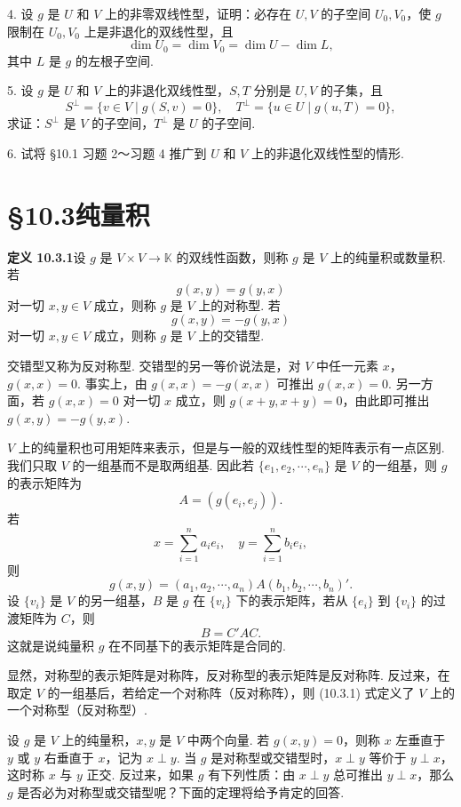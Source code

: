 \documentclass[UTF8, 12pt, fontset=fandol, oneside]{ctexart}
\begin{document}
4. 设 $g$ 是 $U$ 和 $V$ 上的非零双线性型，证明：必存在 $U,V$ 的子空间 $U_0,V_0$，使 $g$ 限制在 $U_0,V_0$ 上是非退化的双线性型，且
\[
  \dim U_0=\dim V_0=\dim U-\dim L,
\]
其中 $L$ 是 $g$ 的左根子空间.

5. 设 $g$ 是 $U$ 和 $V$ 上的非退化双线性型，$S,T$ 分别是 $U,V$ 的子集，且
\[
  S^\perp=\{v\in V\mid g(S,v)=0\},\quad T^\perp=\{u\in U\mid g(u,T)=0\},
\]
求证：$S^\perp$ 是 $V$ 的子空间，$T^\perp$ 是 $U$ 的子空间.

6. 试将 §10.1 习题 2～习题 4 推广到 $U$ 和 $V$ 上的非退化双线性型的情形.

\section*{§10.3\quad 纯量积}

\noindent\textbf{定义 10.3.1}\quad 设 $g$ 是 $V\times V\to\mathbb K$ 的双线性函数，则称 $g$ 是 $V$ 上的纯量积或数量积. 若
\[
  g(x,y)=g(y,x)
\]
对一切 $x,y\in V$ 成立，则称 $g$ 是 $V$ 上的对称型. 若
\[
  g(x,y)=-g(y,x)
\]
对一切 $x,y\in V$ 成立，则称 $g$ 是 $V$ 上的交错型.

交错型又称为反对称型. 交错型的另一等价说法是，对 $V$ 中任一元素 $x$，$g(x,x)=0$. 事实上，由 $g(x,x)=-g(x,x)$ 可推出 $g(x,x)=0$. 另一方面，若 $g(x,x)=0$ 对一切 $x$ 成立，则 $g(x+y,x+y)=0$，由此即可推出 $g(x,y)=-g(y,x)$.

$V$ 上的纯量积也可用矩阵来表示，但是与一般的双线性型的矩阵表示有一点区别. 我们只取 $V$ 的一组基而不是取两组基. 因此若 $\{e_1,e_2,\cdots,e_n\}$ 是 $V$ 的一组基，则 $g$ 的表示矩阵为
\[
  A=(g(e_i,e_j)).
\]
若
\[
  x=\sum_{i=1}^n a_ie_i,\quad y=\sum_{i=1}^n b_ie_i,
\]
则
\begin{equation}
  g(x,y)=(a_1,a_2,\cdots,a_n)A(b_1,b_2,\cdots,b_n)'.
  \tag{10.3.1}
\end{equation}
设 $\{v_i\}$ 是 $V$ 的另一组基，$B$ 是 $g$ 在 $\{v_i\}$ 下的表示矩阵，若从 $\{e_i\}$ 到 $\{v_i\}$ 的过渡矩阵为 $C$，则
\[
  B=C'AC.
\]
这就是说纯量积 $g$ 在不同基下的表示矩阵是合同的.

显然，对称型的表示矩阵是对称阵，反对称型的表示矩阵是反对称阵. 反过来，在取定 $V$ 的一组基后，若给定一个对称阵（反对称阵），则 (10.3.1) 式定义了 $V$ 上的一个对称型（反对称型）.

设 $g$ 是 $V$ 上的纯量积，$x,y$ 是 $V$ 中两个向量. 若 $g(x,y)=0$，则称 $x$ 左垂直于 $y$ 或 $y$ 右垂直于 $x$，记为 $x\perp y$. 当 $g$ 是对称型或交错型时，$x\perp y$ 等价于 $y\perp x$，这时称 $x$ 与 $y$ 正交. 反过来，如果 $g$ 有下列性质：由 $x\perp y$ 总可推出 $y\perp x$，那么 $g$ 是否必为对称型或交错型呢？下面的定理将给予肯定的回答.
\end{document}

